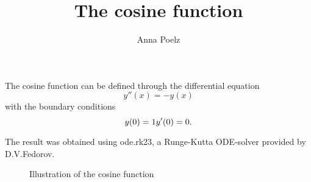 \documentclass{article}
\title{The cosine function}
\author{Anna Poelz}
\begin{document}
\maketitle
The cosine function can be defined through the differential equation
\begin{equation}
	y''(x)=-y(x)
\end{equation}
with the boundary conditions
\begin{equation}
	y(0)=1\\
	y'(0)=0.
\end{equation}

The result was obtained using ode.rk23, a Runge-Kutta ODE-solver provided by D.V.Fedorov. 

\begin{figure}
	
	\caption{Illustration of the cosine function}
\end{figure}
\end{document}
